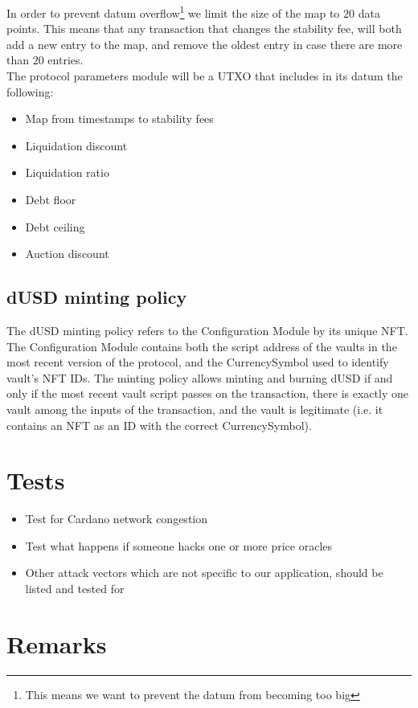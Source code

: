 \documentclass{article} %
\begin{document}
In order to prevent datum overflow\footnote{
  This means we want to prevent the datum from becoming too big}
we limit the size of the map to $20$ data points.
This means that any transaction that changes the stability fee, will both add a
new entry to the map, and remove the oldest entry in case there are more than
$20$ entries. \\

The protocol parameters module will be a UTXO that includes in its datum the following:
\begin{itemize}
  \item Map from timestamps to stability fees
  \item Liquidation discount
  \item Liquidation ratio
  \item Debt floor
  \item Debt ceiling
  \item Auction discount
\end{itemize}

\subsection{dUSD minting policy}

The dUSD minting policy refers to the Configuration Module by its unique NFT.
The Configuration Module contains both the script address of the vaults in the
most recent version of the protocol, and the CurrencySymbol used to identify
vault's NFT IDs. The minting policy allows minting and burning dUSD if and only
if the most recent vault script passes on the transaction, there is exactly one
vault among the inputs of the transaction, and the vault is legitimate (i.e. it
contains an NFT as an ID with the correct CurrencySymbol).

\section{Tests}

\begin{itemize}
  \item Test for Cardano network congestion
  \item Test what happens if someone hacks one or more price oracles
  \item Other attack vectors which are not specific to our application, should
    be listed and tested for
\end{itemize}

\section{Remarks}
\end{document}
